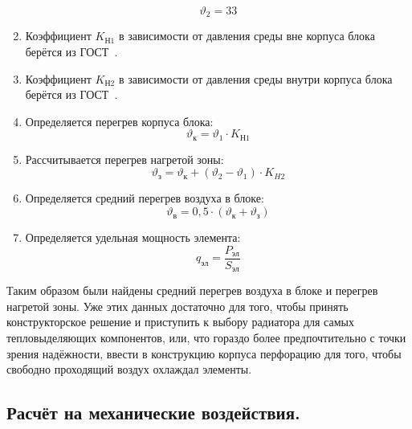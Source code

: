 \begin{enumerate}
$$\vartheta_2 = 33  $$ 

\item Коэффициент $K_{Н1}$ в зависимости от давления
  среды вне корпуса блока берётся из ГОСТ~\cite{GOST-15150-69}.

\item Коэффициент $K_{Н2}$ в зависимости от давления
  среды внутри корпуса блока берётся из ГОСТ~\cite{GOST-15150-69}.

\item Определяется перегрев корпуса блока:
%
  \begin{equation}
    \vartheta_к = \vartheta_1 \cdot K_{Н1}
  \end{equation}

\item Рассчитывается перегрев нагретой зоны:
%
\begin{equation}
  \vartheta_з = \vartheta_к + (\vartheta_2 - \vartheta_1) \cdot K_{H2}
\end{equation}

\item Определяется средний перегрев воздуха в блоке:
%
\begin{equation}
  \vartheta_в = 0,5 \cdot (\vartheta_к + \vartheta_з)
\end{equation}

\item Определяется удельная мощность элемента:
  \begin{equation}
    q_{эл} = \frac{P_{эл}}{S_{эл}}
  \end{equation}

\end{enumerate}

Таким образом были найдены средний перегрев воздуха в блоке и перегрев
нагретой зоны. Уже этих данных достаточно для того, чтобы принять
конструкторское решение и приступить к выбору радиатора для самых
тепловыделяющих компонентов, или, что гораздо более предпочтительно с
точки зрения надёжности, ввести в конструкцию корпуса перфорацию для
того, чтобы свободно проходящий воздух охлаждал элементы.

\subsection{Расчёт на механические воздействия. }


